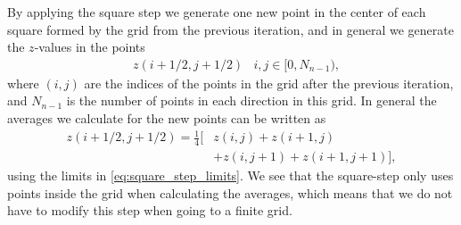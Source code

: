 By applying the square step we generate one new point in the center of each square formed by the grid from the previous iteration, and in general we generate the $z$-values in the points
\begin{align}
    &z(i+1/2, j+1/2) & i,j \in [0, N_{n-1}), \label{eq:square_step_limits}
\end{align}
where $(i,j)$ are the indices of the points in the grid after the previous iteration, and $N_{n-1}$ is the number of points in each direction in this grid. In general the averages we calculate for the new points can be written as
\begin{align}
    z(i+1/2, j+1/2) 
    = \frac{1}{4}\Big[
        &z(i, j) + z(i+1, j) \nonumber\\
        &+ z(i, j+1) + z(i+1, j+1)
    \Big],
    \label{eq:square_step}
\end{align}
using the limits in \cref{eq:square_step_limits}. We see that the square-step only uses points inside the grid when calculating the averages, which means that we do not have to modify this step when going to a finite grid.

